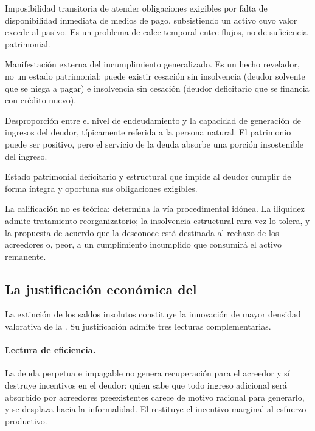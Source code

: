 \begin{description}[leftmargin=0pt,style=nextline,font=\sffamily\bfseries]
  \item[Iliquidez] Imposibilidad transitoria de atender obligaciones exigibles por falta
  de disponibilidad inmediata de medios de pago, subsistiendo un activo cuyo valor
  excede al pasivo. Es un problema de calce temporal entre flujos, no de suficiencia
  patrimonial.

  \item[Cesación de pagos] Manifestación externa del incumplimiento generalizado. Es un
  hecho revelador, no un estado patrimonial: puede existir cesación sin insolvencia
  (deudor solvente que se niega a pagar) e insolvencia sin cesación (deudor deficitario
  que se financia con crédito nuevo).

  \item[Sobreendeudamiento] Desproporción entre el nivel de endeudamiento y la capacidad
  de generación de ingresos del deudor, típicamente referida a la persona natural. El
  patrimonio puede ser positivo, pero el servicio de la deuda absorbe una porción
  insostenible del ingreso.

  \item[Insolvencia] Estado patrimonial deficitario y estructural que impide al deudor
  cumplir de forma íntegra y oportuna sus obligaciones exigibles.
\end{description}

\begin{alerta}
La calificación no es teórica: determina la vía procedimental idónea. La iliquidez
admite tratamiento reorganizatorio; la insolvencia estructural rara vez lo tolera, y la
propuesta de acuerdo que la desconoce está destinada al rechazo de los acreedores o,
peor, a un cumplimiento incumplido que consumirá el activo remanente.
\end{alerta}

\subsection{La justificación económica del \discharge{}}

La extinción de los saldos insolutos constituye la innovación de mayor densidad
valorativa de la \LIR{}. Su justificación admite tres lecturas complementarias.

\paragraph{Lectura de eficiencia.} La deuda perpetua e impagable no genera recuperación
para el acreedor y sí destruye incentivos en el deudor: quien sabe que todo ingreso
adicional será absorbido por acreedores preexistentes carece de motivo racional para
generarlo, y se desplaza hacia la informalidad. El \discharge{} restituye el incentivo
marginal al esfuerzo productivo.

